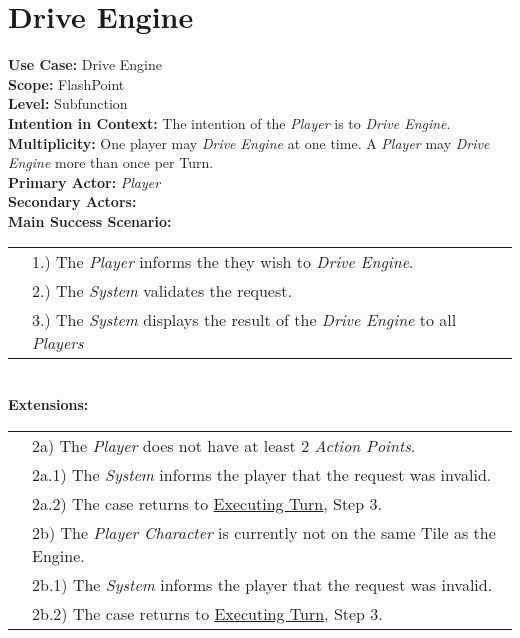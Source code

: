 \documentclass{article}
\begin{document}
	\section*{Drive Engine}
	\textbf{Use Case:} Drive Engine\\
	\textbf{Scope:} FlashPoint\\
	\textbf{Level:} Subfunction\\
	\textbf{Intention in Context:} The intention of the \textit{Player} is to \textit{Drive Engine}.\\
	\textbf{Multiplicity: } One player may \textit{Drive Engine} at one time. A \textit{Player} may \textit{Drive Engine} more than once per Turn.\\
	\textbf{Primary Actor:} \textit{Player}\\
	\textbf{Secondary Actors:}\\
	\textbf{Main Success Scenario:}\\
	\begin{tabular}{l l}
		&1.) The \textit{Player} informs the \text{System} they wish to \textit{Drive Engine}. \\
		&2.) The \textit{System} validates the request. \\
		&3.) The \textit{System} displays the result of the \textit{Drive Engine} to all \textit{Players}
	\end{tabular}\\
	\textbf{Extensions: } \\
	\begin{tabular}{l l}
		&2a) The \textit{Player} does not have at least 2 \textit{Action Points}.\\
		&\qquad2a.1) The \textit{System} informs the player that the request was invalid. \\
		&\qquad2a.2) The case returns to \underline{Executing Turn}, Step 3.\\
		&2b) The \textit{Player Character} is currently not on the same Tile as the Engine.\\
		&\qquad2b.1) The \textit{System} informs the player that the request was invalid. \\
		&\qquad2b.2) The case returns to \underline{Executing Turn}, Step 3.\\
	\end{tabular}
\end{document}
